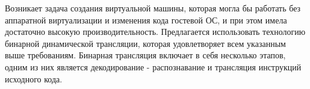 Возникает задача создания виртуальной машины, которая могла бы работать без аппаратной виртуализации и изменения кода гостевой ОС, и при этом имела достаточно высокую производительность. Предлагается использовать технологию бинарной динамической трансляции, которая удовлетворяет всем указанным выше требованиям. Бинарная трансляция включает в себя несколько этапов, одним из них является декодирование - распознавание и трансляция инструкций исходного кода.

